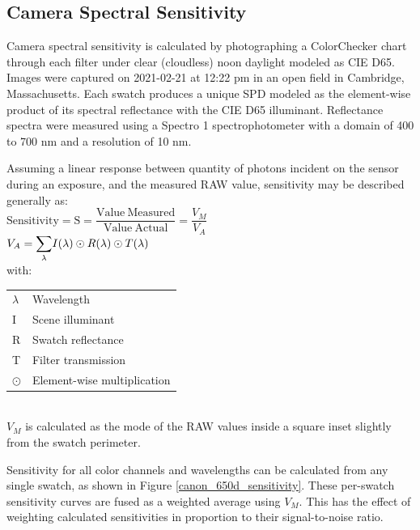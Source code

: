 \documentclass[twocolumn,10pt]{asme2ej}
\newcommand{\id}{\hspace{6 mm}}
\begin{document}
\subsection{Camera Spectral Sensitivity}

\label{Camera_Spectral_Sensitivity}

Camera spectral sensitivity is calculated by photographing a ColorChecker chart through each filter under clear (cloudless) noon daylight modeled as CIE D65. Images were captured on 2021-02-21 at 12:22 pm in an open field in Cambridge, Massachusetts. Each swatch produces a unique SPD modeled as the element-wise product of its spectral reflectance with the CIE D65 illuminant. \cite{CVRL} Reflectance spectra were measured using a Spectro 1 spectrophotometer with a domain of 400 to 700 nm and a resolution of 10 nm.

\id Assuming a linear response between quantity of photons incident on the sensor during an exposure, and the measured RAW value, sensitivity may be described generally as:\\

$\mathrm{ Sensitivity = S = \dfrac{Value \ Measured}{Value \ Actual} } = \dfrac{V_M}{V_A}$ \\

$V_A = \mathlarger{\sum_{\lambda}} I(\lambda) \odot R(\lambda) \odot T(\lambda)$ \\

with: \\

\begin{tabular}{l | l}
$\lambda$ & Wavelength \\
I & Scene illuminant\\
R & Swatch reflectance \\
T & Filter transmission \\
$\odot$ & Element-wise multiplication \\
\end{tabular} \\

$V_M$ is calculated as the mode of the RAW values inside a square inset slightly from the swatch perimeter.

\id Sensitivity for all color channels and wavelengths can be calculated from any single swatch, as shown in Figure \ref{canon_650d_sensitivity}. These per-swatch sensitivity curves are fused as a weighted average using $V_M$. This has the effect of weighting calculated sensitivities in proportion to their signal-to-noise ratio.
\end{document}
